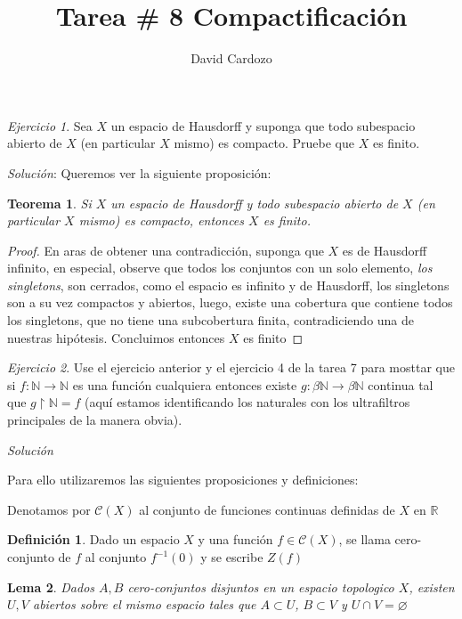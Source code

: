 \documentclass[11pt,a4paper,draft]{article}
\author{David Cardozo}
\title{Tarea \# 8 Compactificación}
\newtheorem{thm}{Teorema}
\newtheorem{lem}[thm]{Lema}
\theoremstyle{definition}
\newtheorem{defn}{Definición}[section]
\theoremstyle{remark}
\newtheorem{exc}{Ejercicio}
\begin{document}
\maketitle
\begin{exc}
	Sea $ X $ un espacio de Hausdorff y suponga que todo subespacio abierto de $ X $ (en particular $ X $ mismo) es compacto. Pruebe que $ X $ es finito.
\end{exc}
\textit{Solución}: Queremos ver la siguiente proposición:

\begin{thm}
	Si $ X $ un espacio de Hausdorff y todo subespacio abierto de $ X $ (en particular $ X $ mismo) es compacto, entonces $ X $ es finito.
\end{thm}
\begin{proof}
	En aras de obtener una contradicción, suponga que $ X $ es de Hausdorff infinito, en especial, observe que todos los conjuntos con un solo elemento, \textit{los singletons}, son cerrados, como el espacio es infinito y de Hausdorff, los singletons son a su vez compactos y abiertos, luego, existe una cobertura que contiene todos los singletons, que no tiene una subcobertura finita, contradiciendo una de nuestras hipótesis. Concluimos entonces $ X $ es  finito
\end{proof}

\begin{exc}
	Use el ejercicio anterior y el ejercicio 4 de la tarea 7 para mosttar que si $ f : \mathbb{N} \to \mathbb{N} $ es una función cualquiera entonces existe $ g : \beta\mathbb{N} \to \beta\mathbb{N} $ continua tal que $ g \upharpoonright \mathbb{N} = f $ (aquí estamos identificando los naturales con los ultrafiltros principales de la manera obvia).
\end{exc}

\textit{Solución}

Para ello utilizaremos las siguientes proposiciones y definiciones:

Denotamos por $ \mathcal{C}(X) $ al conjunto  de funciones continuas definidas de $ X $ en $ \mathbb{R} $ 
\begin{defn}
	Dado un espacio $ X $ y una función $ f \in \mathcal{C}(X) $, se llama cero-conjunto de $ f $ al conjunto $ f^{-1}(0) $ y se escribe  $ Z(f) $
\end{defn}

\begin{lem}
	Dados $ A,B $ cero-conjuntos disjuntos en un espacio topologico $ X $, existen $ U,V $ abiertos sobre el mismo espacio tales que $ A \subset U $, $ B \subset V $ y $ U \cap V = \varnothing $
\end{lem}
\end{document}
